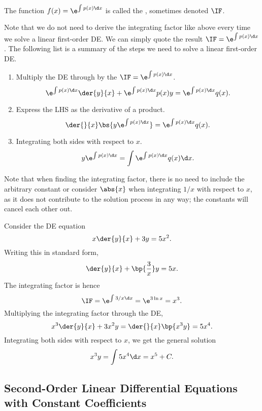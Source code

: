 \begin{definition}
    The function $f(x) = \e^{\int p(x) \d x}$ is called the , sometimes denoted $\IF$.
\end{definition}

Note that we do not need to derive the integrating factor like above every time we solve a linear first-order DE. We can simply quote the result $\IF = \e^{\int p(x) \d x}$. The following list is a summary of the steps we need to solve a linear first-order DE.

\begin{recipe}
    \phantom{.}
    \renewcommand{\theenumi}{\arabic{enumi}.}%
    \begin{enumerate}
        \item Multiply the DE through by the $\IF = \e^{\int p(x) \d x}$. \[\e^{\int p(x) \d x} \der{y}{x} + \e^{\int p(x) \d x} p(x) y = \e^{\int p(x) \d x} q(x).\]
        \item Express the LHS as the derivative of a product. \[\der{}{x} \bs{y \e^{\int p(x) \d x}} = \e^{\int p(x) \d x} q(x).\]
        \item Integrating both sides with respect to $x$. \[y \e^{\int p(x) \d x} = \int \e^{\int p(x) \d x} q(x) \d x.\]
    \end{enumerate}
    \renewcommand{\theenumi}{(\alph{enumi})}
\end{recipe}

Note that when finding the integrating factor, there is no need to include the arbitrary constant or consider $\abs{x}$ when integrating $1/x$ with respect to $x$, as it does not contribute to the solution process in any way; the constants will cancel each other out.

\begin{example}
    Consider the DE equation \[x \der{y}{x} + 3y = 5x^2.\] Writing this in standard form, \[\der{y}{x} + \bp{\frac3x}y = 5x.\] The integrating factor is hence \[\IF = \e^{\int 3/x \d x} = \e^{3\ln x} = x^3.\] Multiplying the integrating factor through the DE, \[x^3 \der{y}{x} + 3x^2 y = \der{}{x} \bp{x^3 y} = 5x^4.\] Integrating both sides with respect to $x$, we get the general solution \[x^3 y = \int 5x^4 \d x = x^5 + C.\]
\end{example}

\subsection{Second-Order Linear Differential Equations with Constant Coefficients}

